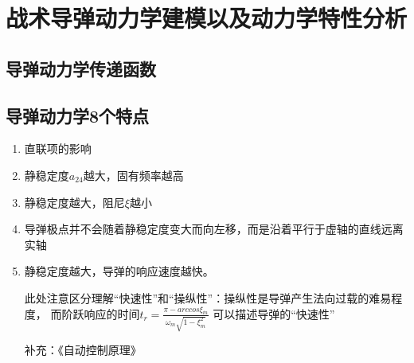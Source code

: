 \chapter{战术导弹动力学建模以及动力学特性分析}
\section{导弹动力学传递函数}
\section{导弹动力学8个特点}
\begin{enumerate}[1)]
    \item 直联项的影响
    \item 静稳定度$a_{24}$越大，固有频率越高
    \item 静稳定度越大，阻尼$\xi$越小
    \item 导弹极点并不会随着静稳定度变大而向左移，而是沿着平行于虚轴的直线远离实轴
    \item 静稳定度越大，导弹的响应速度越快。
    
    {\kaishu 此处注意区分理解“快速性”和“操纵性”：操纵性是导弹产生法向过载的难易程度，
    而阶跃响应的时间$t_r = \frac{\pi - arccos\xi_{\dot{m}}}{\omega_{m}\sqrt{1-\xi_{m}^2}}$
    可以描述导弹的“快速性”
    
    补充：《自动控制原理》
    
}
\end{enumerate}
